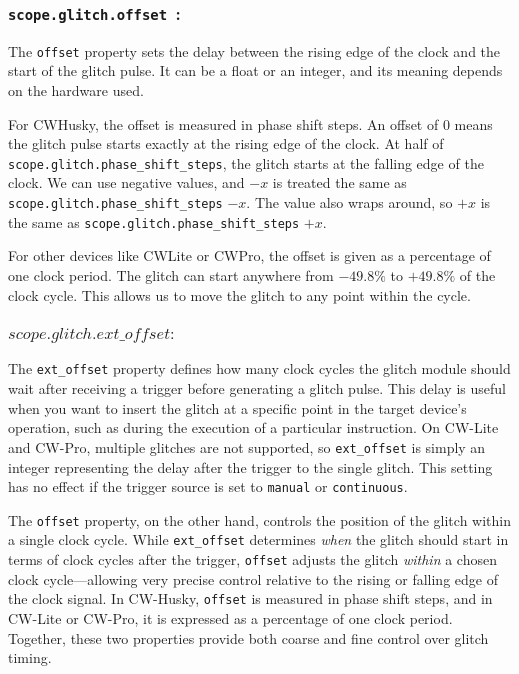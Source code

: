 \subsubsection{\textbf{\texttt{scope.glitch.offset }:}}
The \texttt{offset} property sets the delay between the rising edge of the clock and the start of the glitch pulse. It can be a float or an integer, and its meaning depends on the hardware used.

For CWHusky, the offset is measured in phase shift steps. An offset of 0 means the glitch pulse starts exactly at the rising edge of the clock. At half of \texttt{scope.glitch.phase\_shift\_steps}, the glitch starts at the falling edge of the clock. We can use negative values, and $-x$ is treated the same as \texttt{scope.glitch.phase\_shift\_steps} $- x$. The value also wraps around, so $+x$ is the same as \texttt{scope.glitch.phase\_shift\_steps} $+ x$. 

For other devices like CWLite or CWPro, the offset is given as a percentage of one clock period. The glitch can start anywhere from $-49.8\%$ to $+49.8\%$ of the clock cycle. This allows us to move the glitch to any point within the cycle.

\subsubsection{$scope.glitch.ext\_offset :$}
The \texttt{ext\_offset} property defines how many clock cycles the glitch module should wait after receiving a trigger before generating a glitch pulse. This delay is useful when you want to insert the glitch at a specific point in the target device’s operation, such as during the execution of a particular instruction. On CW-Lite and CW-Pro, multiple glitches are not supported, so \texttt{ext\_offset} is simply an integer representing the delay after the trigger to the single glitch. This setting has no effect if the trigger source is set to \texttt{manual} or \texttt{continuous}.

The \texttt{offset} property, on the other hand, controls the position of the glitch within a single clock cycle. While \texttt{ext\_offset} determines \emph{when} the glitch should start in terms of clock cycles after the trigger, \texttt{offset} adjusts the glitch \emph{within} a chosen clock cycle—allowing very precise control relative to the rising or falling edge of the clock signal. In CW-Husky, \texttt{offset} is measured in phase shift steps, and in CW-Lite or CW-Pro, it is expressed as a percentage of one clock period. Together, these two properties provide both coarse and fine control over glitch timing.


